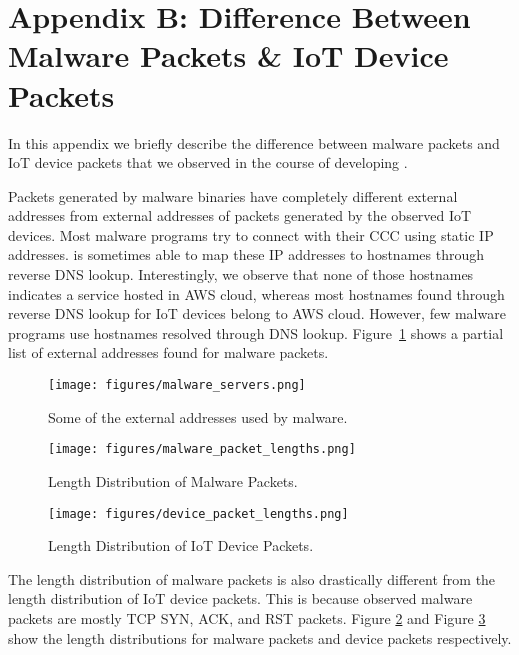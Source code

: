 \renewcommand{\thefigure}{B\arabic{figure}}
\setcounter{figure}{0}



\section*{Appendix B: Difference Between Malware Packets \& IoT Device Packets}
\label{appendix: packet  difference}
In this appendix we briefly describe the difference between malware packets and IoT device packets that we observed in the course of developing \system.

Packets generated by malware binaries have completely different external addresses from external addresses of packets generated by the observed IoT devices. Most malware programs try to connect with their CCC using static IP addresses. \system is sometimes able to map these IP addresses to hostnames through reverse DNS lookup. Interestingly, we observe that none of those hostnames indicates a service hosted in AWS cloud, whereas most hostnames found through reverse DNS lookup for IoT devices belong to AWS cloud. However, few malware programs use hostnames resolved through DNS lookup. Figure~\ref{fig: malware address} shows a partial list of external addresses found for malware packets.

\begin{figure}[!ht]
    \centering
    \texttt{[image: figures/malware\_servers.png]}
    \caption{Some of the external addresses used by malware.} 
    \label{fig: malware address}
\end{figure}

\begin{figure}[!ht]
    \centering
    \texttt{[image: figures/malware\_packet\_lengths.png]}
    \caption{Length Distribution of Malware Packets.} 
    \label{fig: malware packet length}
\end{figure}
\begin{figure}[!ht]
    \centering
    \texttt{[image: figures/device\_packet\_lengths.png]}
    \caption{Length Distribution of IoT Device Packets.} 
    \label{fig: device packet length}
\end{figure}

The length distribution of malware packets is also drastically different from the length distribution of IoT device packets. This is because observed malware packets are mostly TCP SYN, ACK, and RST packets. Figure \ref{fig: malware packet length} and Figure \ref{fig: device packet length} show the length distributions for malware packets and device packets respectively. 